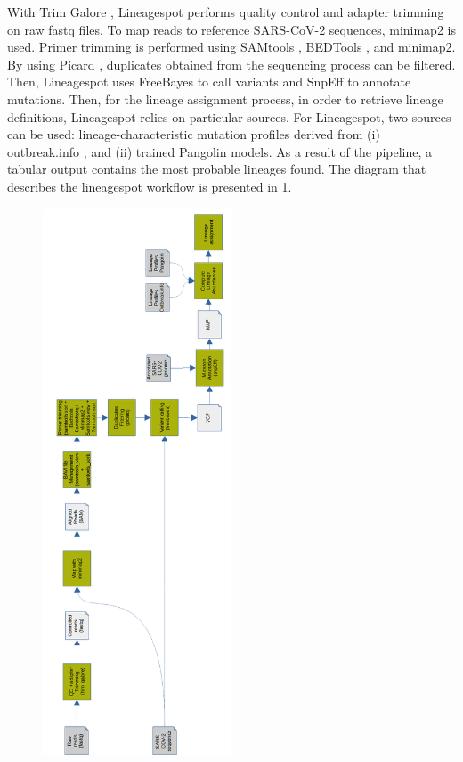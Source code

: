         With Trim Galore \cite{krueger2021}, Lineagespot performs quality control and adapter trimming on raw \acrshort{fastq} files. To map reads to reference SARS-CoV-2 sequences, minimap2 \cite{li2018} is used. Primer trimming is performed using SAMtools \cite{li2009}, BEDTools \cite{bedtools}, and minimap2. By using Picard \cite{picard}, duplicates obtained from the sequencing process can be filtered. Then, Lineagespot uses FreeBayes \cite{garrison2012} to call variants and SnpEff \cite{snpeff} to annotate mutations. Then, for the lineage assignment process, in order to retrieve lineage definitions, Lineagespot relies on particular sources. For Lineagespot, two sources can be used: lineage-characteristic mutation profiles derived from (i) outbreak.info \cite{outbreakinfo}, and (ii) trained Pangolin \cite{otoole2021} models. As a result of the pipeline, a tabular output contains the most probable lineages found. The diagram that describes the lineagespot workflow is presented in \cref{fig:prior:ls}.
        
        \begin{figure}[h]
        	\centering
            \includegraphics[width=0.5\textwidth]{figures/prior/lineagespot_vertical.png}
            \label{fig:prior:ls}
        \end{figure}
        
